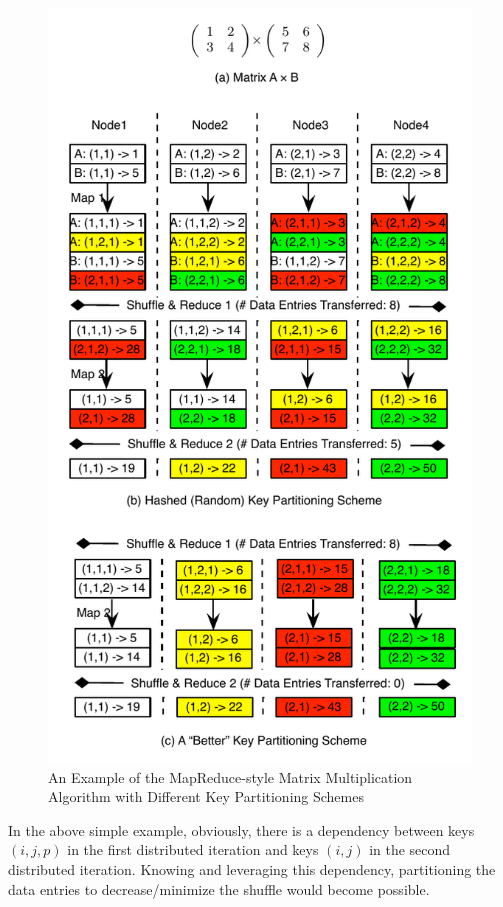\documentclass[10pt,journal,compsoc]{IEEEtran}
\begin{document}
\begin{figure}[!t]
\centering
\includegraphics[width=1\columnwidth]{figure1}
\caption{An Example of the MapReduce-style Matrix Multiplication Algorithm with Different Key Partitioning Schemes 
}
\label{fig:matrixExample}
\end{figure}



In the above simple example, obviously, there is a dependency between
keys $(i,j,p)$ in the first distributed iteration and  keys $(i,j)$ in the second distributed iteration.
 Knowing and leveraging this
dependency, partitioning the data entries to decrease/minimize the shuffle
would become possible.
\end{document}
